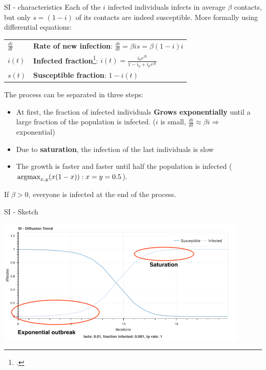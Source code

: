 \documentclass[a4paper,11pt]{book}
\begin{document}
\begin{textbox}{SI - characteristics}
Each of the $i$ infected individuals infects in average $\beta$ contacts, but only $s=(1-i)$ of its contacts are indeed susceptible. More formally using differential equations:

\begin{tabular}{p{}|p{}}\scriptsize

$\frac{di}{dt}$ & \textbf{Rate of new infection}: $\frac{di}{dt}=\beta i s=\beta (1-i)i$ \\


$i(t)$ & \textbf{Infected fraction}\footcite{barrat2008dynamical}: $i(t)=\frac{i_0e^{\beta t}}{1-i_0+i_0e^{\beta t}}$\\
$s(t)$ & \textbf{Susceptible fraction}: $1-i(t)$

\end{tabular}
The process can be separated in three steps:
\begin{itemize}
    \item At first, the fraction of infected individuals \textbf{Grows exponentially} until a large fraction of the population is infected. ($i$ is small,  $\frac{di}{dt}\approx \beta i \Rightarrow$ exponential)
    \item Due to \textbf{saturation}, the infection of the last individuals is slow
    \item The growth is faster and faster until half the population is infected ($\operatorname*{argmax}_ {x,y}(x(1-x)):x=y=0.5$).
\end{itemize}



If $\beta>0$, everyone is infected at the end of the process.

\end{textbox}

\begin{textbox}{SI - Sketch}

\centering
\includegraphics[width=0.9\textwidth]{pics/SIXP.png}
\end{textbox}
\end{document}
